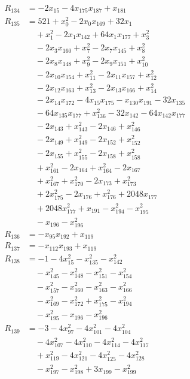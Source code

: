 \begin{align*}
R_{134}&=-2x_{15}-4x_{175}x_{187}+x_{181}\\
R_{135}&=521+x_{0}^{2}-2x_{0}x_{169}+32x_{1}\\
&\quad{}+x_{1}^{2}-2x_{1}x_{142}+64x_{1}x_{177}+x_{3}^{2}\\
&\quad{}-2x_{3}x_{160}+x_{7}^{2}-2x_{7}x_{145}+x_{8}^{2}\\
&\quad{}-2x_{8}x_{148}+x_{9}^{2}-2x_{9}x_{151}+x_{10}^{2}\\
&\quad{}-2x_{10}x_{154}+x_{11}^{2}-2x_{11}x_{157}+x_{12}^{2}\\
&\quad{}-2x_{12}x_{163}+x_{13}^{2}-2x_{13}x_{166}+x_{14}^{2}\\
&\quad{}-2x_{14}x_{172}-4x_{15}x_{175}-x_{130}x_{191}-32x_{135}\\
&\quad{}-64x_{135}x_{177}+x_{136}^{2}-32x_{142}-64x_{142}x_{177}\\
&\quad{}-2x_{143}+x_{143}^{2}-2x_{146}+x_{146}^{2}\\
&\quad{}-2x_{149}+x_{149}^{2}-2x_{152}+x_{152}^{2}\\
&\quad{}-2x_{155}+x_{155}^{2}-2x_{158}+x_{158}^{2}\\
&\quad{}+x_{161}^{2}-2x_{164}+x_{164}^{2}-2x_{167}\\
&\quad{}+x_{167}^{2}+x_{170}^{2}-2x_{173}+x_{173}^{2}\\
&\quad{}+2x_{175}^{2}-2x_{176}+x_{176}^{2}+2048x_{177}\\
&\quad{}+2048x_{177}^{2}+x_{191}-x_{194}^{2}-x_{195}^{2}\\
&\quad{}-x_{196}-x_{196}^{2}\\
R_{136}&=-x_{95}x_{192}+x_{119}\\
R_{137}&=-x_{112}x_{193}+x_{119}\\
R_{138}&=-1-4x_{15}^{2}-x_{135}^{2}-x_{142}^{2}\\
&\quad{}-x_{145}^{2}-x_{148}^{2}-x_{151}^{2}-x_{154}^{2}\\
&\quad{}-x_{157}^{2}-x_{160}^{2}-x_{163}^{2}-x_{166}^{2}\\
&\quad{}-x_{169}^{2}-x_{172}^{2}+x_{175}^{2}-x_{194}^{2}\\
&\quad{}-x_{195}^{2}-x_{196}-x_{196}^{2}\\
R_{139}&=-3-4x_{97}^{2}-4x_{101}^{2}-4x_{104}^{2}\\
&\quad{}-4x_{107}^{2}-4x_{110}^{2}-4x_{114}^{2}-4x_{117}^{2}\\
&\quad{}+x_{119}^{2}-4x_{121}^{2}-4x_{125}^{2}-4x_{128}^{2}\\
&\quad{}-x_{197}^{2}-x_{198}^{2}+3x_{199}-x_{199}^{2}\\

\end{align*}
